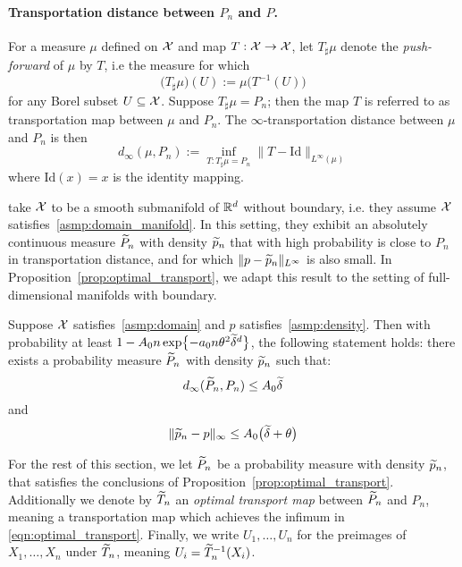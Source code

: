 \paragraph{Transportation distance between $P_n$ and $P$.}
For a measure $\mu$ defined on $\mathcal{X}$ and map $T: \mathcal{X} \to \mathcal{X}$, let $T_{\sharp}\mu$ denote the \emph{push-forward} of $\mu$ by $T$, i.e the measure for which
\begin{equation*}
\bigl(T_{\sharp}\mu\bigr)(U) := \mu\bigl(T^{-1}(U)\bigr)
\end{equation*}
for any Borel subset $U \subseteq \mathcal{X}$. Suppose $T_{\sharp}\mu = P_n$; then the map $T$ is referred to as transportation map between $\mu$ and $P_n$. The  $\infty$-transportation distance between $\mu$ and $P_n$ is then
\begin{equation}
\label{eqn:optimal_transport}
d_{\infty}(\mu,P_n) := \inf_{T: T_{\sharp} \mu = P_n} \|T - \mathrm{Id}\|_{L^{\infty}(\mu)}
\end{equation}
where $\mathrm{Id}(x) = x$ is the identity mapping.

\citet{calder2019} take $\mathcal{X}$ to be a smooth submanifold of $\mathbb{R}^d$ without boundary, i.e. they assume $\mathcal{X}$ satisfies~\ref{asmp:domain_manifold}. In this setting, they exhibit an absolutely continuous measure $\widetilde{P}_n$ with density $\widetilde{p}_n$ that with high probability is close to $P_n$ in transportation distance, and for which $\|p - \widetilde{p}_n\|_{L^\infty}$ is also small. In Proposition~\ref{prop:optimal_transport}, we adapt this result to the setting of full-dimensional manifolds with boundary.  
\begin{proposition}
	\label{prop:optimal_transport}
	Suppose $\mathcal{X}$ satisfies~\ref{asmp:domain} and $p$ satisfies~\ref{asmp:density}. Then with probability at least $1 - A_0 n \exp\bigl\{-a_0 n\theta^2\widetilde{\delta}^d\bigr\}$, the following statement holds: there exists a probability measure $\widetilde{P}_n$ with density $\widetilde{p}_n$ such that:
	\begin{equation}
	\label{eqn:optimal_transport_1}
	d_{\infty}(\widetilde{P}_n, P_n) \leq A_0 \widetilde{\delta}
	\end{equation}
	and
	\begin{equation}
	\label{eqn:optimal_transport_2}
	\|\widetilde{p}_n - p\|_{\infty} \leq A_0\bigl(\widetilde{\delta} + \theta\bigr)
	\end{equation}
\end{proposition}
For the rest of this section, we let $\widetilde{P}_n$ be a probability measure with density $\widetilde{p}_n$, that satisfies the conclusions of Proposition~\ref{prop:optimal_transport}. Additionally we denote by $\widetilde{T}_n$ an \emph{optimal transport map} between $\widetilde{P}_n$ and $P_n$, meaning a transportation map which achieves the infimum in \eqref{eqn:optimal_transport}. Finally, we write $U_1,\ldots,U_n$ for the preimages of $X_1,\ldots,X_n$ under $\widetilde{T}_n$, meaning $U_i = \widetilde{T}_n^{-1}(X_i)$. 

